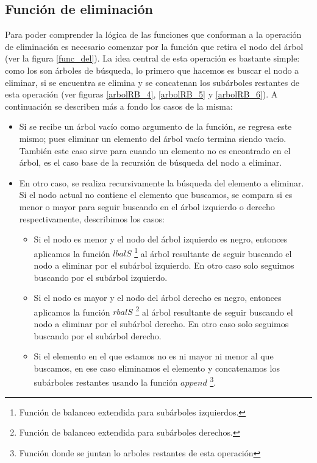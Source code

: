 \subsection{Funci\'on de eliminaci\'on}

Para poder comprender la l\'ogica de las funciones que conforman a la operaci\'on de eliminaci\'on
es necesario comenzar por la funci\'on que retira el nodo del \'arbol (ver la figura \ref{func_del}).
La idea central de esta operaci\'on es bastante simple: como los {\arns} son \'arboles de búsqueda,
lo primero que hacemos es buscar el nodo a eliminar, si se encuentra se elimina y se concatenan los
subárboles restantes de esta operaci\'on (ver figuras \ref{arbolRB_4}, \ref{arbolRB_5} y
\ref{arbolRB_6}). A continuaci\'on se describen m\'as a fondo los casos de la misma:

\begin{itemize}
    \item Si se recibe un \'arbol vacío como argumento de la funci\'on, se regresa este mismo; pues
    eliminar un elemento del \'arbol vacío termina siendo vacío. También este caso sirve para
    cuando un elemento no es encontrado en el \'arbol, es el caso base de la recursi\'on de
    búsqueda del nodo a eliminar.
    \item En otro caso, se realiza recursivamente la búsqueda del elemento a eliminar. Si el nodo
    actual no contiene el elemento que buscamos, se compara si es menor o mayor para seguir
    buscando en el \'arbol izquierdo o derecho respectivamente, describimos los casos:
    \begin{itemize}
        \item Si el nodo es menor y el nodo del \'arbol izquierdo es negro, entonces aplicamos la funci\'on $lbalS$ \footnote{Funci\'on de balanceo extendida para subárboles
    izquierdos.} al \'arbol resultante de seguir buscando el nodo a eliminar por el subárbol izquierdo. 
        En otro caso solo seguimos buscando por el subárbol izquierdo.
        \item Si el nodo es mayor y el nodo del \'arbol derecho es negro, entonces aplicamos la funci\'on $rbalS$ \footnote{Funci\'on de balanceo extendida para subárboles
    derechos.} al \'arbol resultante de seguir buscando el nodo a eliminar por el subárbol derecho. 
        En otro caso solo seguimos buscando por el subárbol derecho.
        \item Si el elemento en el que estamos no es ni mayor ni menor al que buscamos, en ese
    caso eliminamos el elemento y concatenamos los subárboles restantes usando la función $append$
    \footnote{Funci\'on donde se juntan lo arboles restantes de esta operaci\'on}.
    \end{itemize}
    
\end{itemize}

